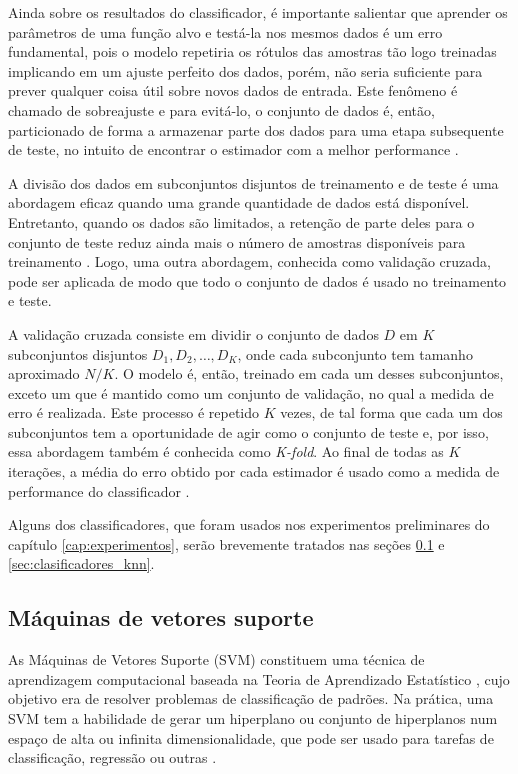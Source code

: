 Ainda sobre os resultados do classificador, é importante salientar que aprender os parâmetros de uma função alvo e testá-la nos mesmos dados é um erro fundamental, pois o modelo repetiria os rótulos das amostras tão logo treinadas implicando em um ajuste perfeito dos dados, porém, não seria suficiente para prever qualquer coisa útil sobre novos dados de entrada. Este fenômeno é chamado de sobreajuste e para evitá-lo, o conjunto de dados é, então, particionado de forma a armazenar parte dos dados para uma etapa subsequente de teste, no intuito de encontrar o estimador com a melhor performance \citep{mostafa:12}.

A divisão dos dados em subconjuntos disjuntos de treinamento e de teste é uma abordagem eficaz quando uma grande quantidade de dados está disponível. Entretanto, quando os dados são limitados, a retenção de parte deles para o conjunto de teste reduz ainda mais o número de amostras disponíveis para treinamento \citep{mitchell:97}. Logo, uma outra abordagem, conhecida como validação cruzada, pode ser aplicada de modo que todo o conjunto de dados é usado no treinamento e teste.

A validação cruzada consiste em dividir o conjunto de dados $D$ em $K$ subconjuntos disjuntos $D_1, D_2, \ldots, D_K$, onde cada subconjunto tem tamanho aproximado $N/K$. O modelo é, então, treinado em cada um desses subconjuntos, exceto um que é mantido como um conjunto de validação, no qual a medida de erro é realizada. Este processo é repetido $K$ vezes, de tal forma que cada um dos subconjuntos tem a oportunidade de agir como o conjunto de teste e, por isso, essa abordagem também é conhecida como \emph{K-fold}. Ao final de todas as $K$ iterações, a média do erro obtido por cada estimador é usado como a medida de performance do classificador \citep{mostafa:12}.

Alguns dos classificadores, que foram usados nos experimentos preliminares do capítulo \ref{cap:experimentos}, serão brevemente tratados nas seções \ref{sec:clasificadores_svm} e \ref{sec:clasificadores_knn}.


\subsection{Máquinas de vetores suporte}
\label{sec:clasificadores_svm}
As Máquinas de Vetores Suporte (SVM) constituem uma técnica de aprendizagem computacional baseada na Teoria de Aprendizado Estatístico \citep{vapnik:13}, cujo objetivo era de resolver problemas de classificação de padrões. Na prática, uma SVM tem a habilidade de gerar um hiperplano ou conjunto de hiperplanos num espaço de alta ou infinita dimensionalidade, que pode ser usado para tarefas de classificação, regressão ou outras \citep{duda:12}.

